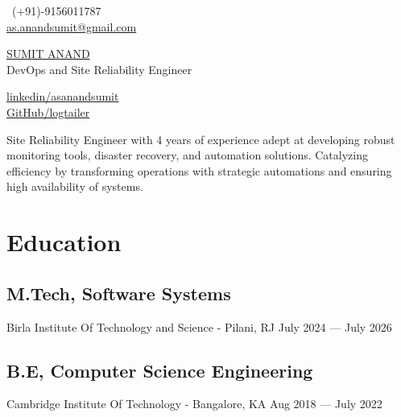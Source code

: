 \documentclass[a4,10pt]{article}
\begin{document}
\begin{center}
    \begin{minipage}[b]{0.24\textwidth}
            \ (+91)-9156011787 \\
            \normalsize \href{mailto:as.anandsumit@gmail.com}{as.anandsumit@gmail.com} 
    \end{minipage}%
    \begin{minipage}[b]{0.5\textwidth}
            \centering
            {\Huge \underline {SUMIT ANAND}} \\ %
            \vspace{0.1cm}
            {\color{UI_blue} \Large{DevOps and Site Reliability Engineer}} \\
    \end{minipage}%
    \begin{minipage}[b]{0.24\textwidth}
            \flushright \normalsize  %
            {\href{https://www.linkedin.com/in/asanandsumit/}{linkedin/asanandsumit} } \\
            \href{https://github.com/logtailer}{GitHub/logtailer}
    \end{minipage}   

    {\color{UI_blue} \hrulefill}
\end{center}

Site Reliability Engineer with 4 years of experience adept at developing robust monitoring tools, disaster recovery, and automation solutions. Catalyzing efficiency by transforming operations with strategic automations and ensuring high availability of systems.  %
\vspace{-0.25cm}
\section{Education }

\subsection{M.Tech, Software Systems}
{{\normalsize \normalfont Birla Institute Of Technology and Science - Pilani, RJ} \hfill July 2024 --- July 2026}
\subsection*{B.E, Computer Science Engineering} 
{{\normalsize \normalfont Cambridge Institute Of Technology - Bangalore, KA} \hfill Aug 2018 --- July 2022} 
\vspace{-0.3cm}
\end{document}
